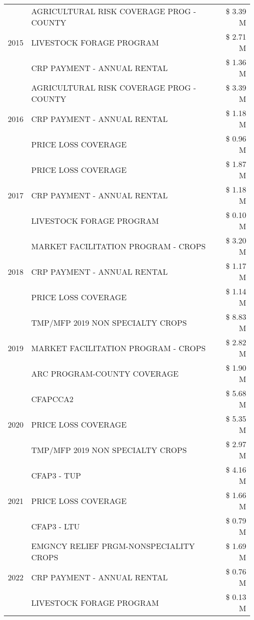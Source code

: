 \begin{tabular}{llr}
\cline{1-3}
\multirow[t]{3}{*}{2015} & AGRICULTURAL RISK COVERAGE PROG - COUNTY & \$ 3.39 M \\
 & LIVESTOCK FORAGE PROGRAM & \$ 2.71 M \\
 & CRP PAYMENT - ANNUAL RENTAL & \$ 1.36 M \\
\cline{1-3}
\multirow[t]{3}{*}{2016} & AGRICULTURAL RISK COVERAGE PROG - COUNTY & \$ 3.39 M \\
 & CRP PAYMENT - ANNUAL RENTAL & \$ 1.18 M \\
 & PRICE LOSS COVERAGE & \$ 0.96 M \\
\cline{1-3}
\multirow[t]{3}{*}{2017} & PRICE LOSS COVERAGE & \$ 1.87 M \\
 & CRP PAYMENT - ANNUAL RENTAL & \$ 1.18 M \\
 & LIVESTOCK FORAGE PROGRAM & \$ 0.10 M \\
\cline{1-3}
\multirow[t]{3}{*}{2018} & MARKET FACILITATION PROGRAM - CROPS & \$ 3.20 M \\
 & CRP PAYMENT - ANNUAL RENTAL & \$ 1.17 M \\
 & PRICE LOSS COVERAGE & \$ 1.14 M \\
\cline{1-3}
\multirow[t]{3}{*}{2019} & TMP/MFP 2019 NON SPECIALTY CROPS & \$ 8.83 M \\
 & MARKET FACILITATION PROGRAM - CROPS & \$ 2.82 M \\
 & ARC PROGRAM-COUNTY COVERAGE & \$ 1.90 M \\
\cline{1-3}
\multirow[t]{3}{*}{2020} & CFAPCCA2 & \$ 5.68 M \\
 & PRICE LOSS COVERAGE & \$ 5.35 M \\
 & TMP/MFP 2019 NON SPECIALTY CROPS & \$ 2.97 M \\
\cline{1-3}
\multirow[t]{3}{*}{2021} & CFAP3 - TUP & \$ 4.16 M \\
 & PRICE LOSS COVERAGE & \$ 1.66 M \\
 & CFAP3 - LTU & \$ 0.79 M \\
\cline{1-3}
\multirow[t]{3}{*}{2022} & EMGNCY RELIEF PRGM-NONSPECIALITY CROPS & \$ 1.69 M \\
 & CRP PAYMENT - ANNUAL RENTAL & \$ 0.76 M \\
 & LIVESTOCK FORAGE PROGRAM & \$ 0.13 M \\
\cline{1-3}
\bottomrule
\end{tabular}
